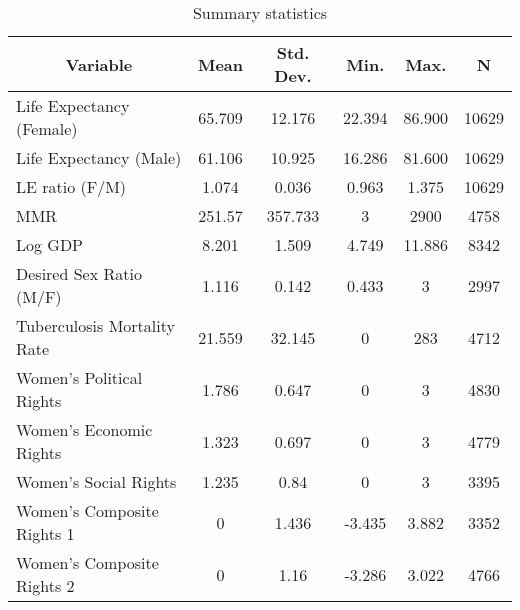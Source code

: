\documentclass[10pt,letterpaper,subeqn]{beamer}
\begin{document}
\begin{frame}
\begin{table}[htbp]\centering 
\scriptsize
\caption{Summary statistics \label{sumstat}}
\begin{tabular}{l c c c c c}\hline\hline
\multicolumn{1}{c}{\textbf{Variable}} & \textbf{Mean}
 & \textbf{Std. Dev.}& \textbf{Min.} &  \textbf{Max.} & \textbf{N}\\ 
\hline
Life Expectancy (Female)& 65.709 & 12.176 & 22.394 & 86.900 & 10629\\
Life Expectancy (Male) & 61.106 & 10.925 & 16.286 & 81.600 & 10629\\
LE ratio (F/M) & 1.074 & 0.036 & 0.963 & 1.375 & 10629\\
MMR & 251.57 & 357.733 & 3 & 2900 & 4758\\
Log GDP & 8.201 & 1.509 & 4.749 & 11.886 & 8342\\
Desired Sex Ratio (M/F) & 1.116 & 0.142 & 0.433 & 3 & 2997\\
Tuberculosis Mortality Rate & 21.559 & 32.145 & 0 & 283 & 4712\\
Women's Political Rights & 1.786 & 0.647 & 0 & 3 & 4830\\
Women's Economic Rights  & 1.323 & 0.697 & 0 & 3 & 4779\\
Women's Social Rights  & 1.235 & 0.84 & 0 & 3 & 3395\\
Women's Composite Rights 1& 0 & 1.436 & -3.435 & 3.882 & 3352\\
Women's Composite Rights 2 & 0 & 1.16 & -3.286 & 3.022 & 4766\\
\hline
\end{tabular}
\end{table}

\end{frame}
\end{document}
